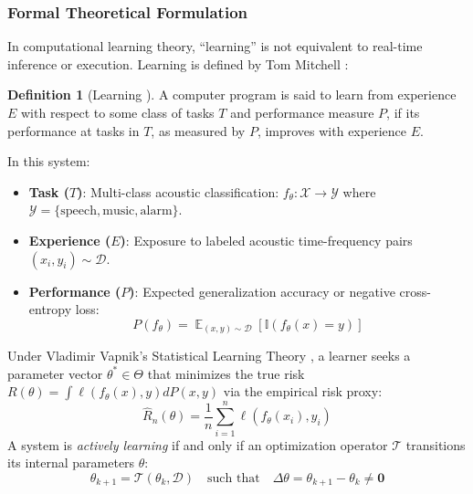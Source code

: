 \documentclass[11pt,a4paper]{article}
\theoremstyle{definition}
\newtheorem{definition}{Definition}[section]
\theoremstyle{plain}
\theoremstyle{remark}
\DeclareMathOperator{\E}{\mathbb{E}}
\begin{document}
\subsubsection{Formal Theoretical Formulation}
In computational learning theory, ``learning'' is not equivalent to real-time inference or execution. Learning is defined by Tom Mitchell \cite{mitchell1997machine}:
\begin{definition}[Learning \cite{mitchell1997machine}]
A computer program is said to learn from experience $E$ with respect to some class of tasks $T$ and performance measure $P$, if its performance at tasks in $T$, as measured by $P$, improves with experience $E$.
\end{definition}

In this system:
\begin{itemize}[noitemsep]
    \item \textbf{Task ($T$)}: Multi-class acoustic classification: $f_\theta: \mathcal{X} \to \mathcal{Y}$ where $\mathcal{Y} = \{\text{speech}, \text{music}, \text{alarm}\}$.
    \item \textbf{Experience ($E$)}: Exposure to labeled acoustic time-frequency pairs $(x_i, y_i) \sim \mathcal{D}$.
    \item \textbf{Performance ($P$)}: Expected generalization accuracy or negative cross-entropy loss:
    \begin{equation}
    P(f_\theta) = \E_{(x,y) \sim \mathcal{D}} [\mathbb{I}(f_\theta(x) = y)]
    \end{equation}
\end{itemize}

Under Vladimir Vapnik's Statistical Learning Theory \cite{vapnik1998statistical}, a learner seeks a parameter vector $\theta^* \in \Theta$ that minimizes the true risk $R(\theta) = \int \ell(f_\theta(x), y) dP(x, y)$ via the empirical risk proxy:
\begin{equation}
\hat{R}_n(\theta) = \frac{1}{n}\sum_{i=1}^n \ell(f_\theta(x_i), y_i)
\end{equation}
A system is \textit{actively learning} if and only if an optimization operator $\mathcal{T}$ transitions its internal parameters $\theta$:
\begin{equation}
\theta_{k+1} = \mathcal{T}(\theta_k, \mathcal{D}) \quad \text{such that} \quad \Delta \theta = \theta_{k+1} - \theta_k \neq \mathbf{0}
\end{equation}
\end{document}
